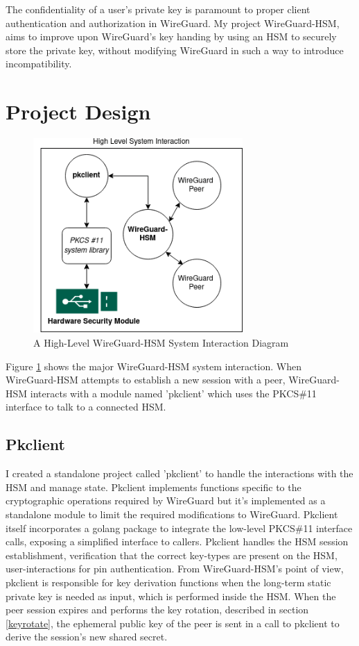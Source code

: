 \documentclass [11pt, proquest] {uwthesis}[2020/02/24]
\begin{document}
The confidentiality of a user's private key is paramount to proper client authentication and authorization in WireGuard. My project WireGuard-HSM, aims to improve upon WireGuard's key handing by using an HSM to securely store the private key, without modifying WireGuard in such a way to introduce incompatibility.

\section{Project Design}
\begin{figure}[ht]
\begin{center}
\includegraphics[width=8cm]{paper/images/high-level-overview.png}
\caption{A High-Level WireGuard-HSM System Interaction Diagram}
\label{fig:highlevel_system}
\end{center}
\end{figure}

Figure \ref{fig:highlevel_system} shows the major WireGuard-HSM system interaction. When WireGuard-HSM attempts to establish a new session with a peer, WireGuard-HSM interacts with a module named 'pkclient' which uses the PKCS\#11 interface to talk to a connected HSM. 

\subsection{Pkclient}
\label{pk_design}
I created a standalone project called 'pkclient' to handle the interactions with the HSM and manage state. Pkclient implements functions specific to the cryptographic operations required by WireGuard but it's implemented as a standalone module to limit the required modifications to WireGuard. Pkclient itself incorporates a golang package to integrate the low-level PKCS\#11 interface calls, exposing a simplified interface to callers.  Pkclient handles the HSM session establishment, verification that the correct key-types are present on the HSM, user-interactions for pin authentication. 
From WireGuard-HSM's point of view, pkclient is responsible for key derivation functions when the long-term static private key is needed as input, which is performed inside the HSM. When the peer session expires and performs the key rotation, described in section \ref{keyrotate}, the ephemeral public key of the peer is sent in a call to pkclient to derive the session's new shared secret. 
\end{document}

